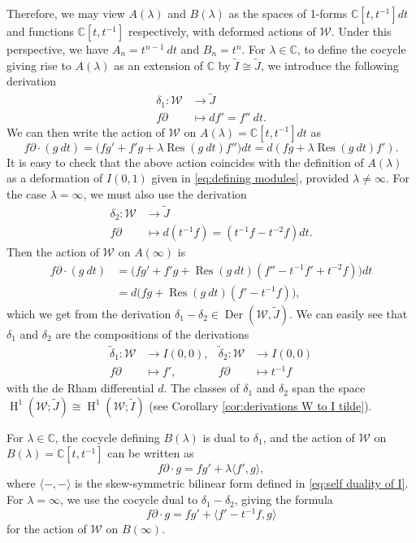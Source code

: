 \documentclass[11pt, svgnames]{amsart}
\DeclareMathOperator{\Res}{Res}
\newcommand{\CC}{\mathbb{C}}
\newcommand{\W}{\mathcal{W}}
\DeclareMathOperator{\Der}{Der}
\newcommand{\del}{\partial}
\DeclareMathOperator{\HH}{H}
\newcommand{\ang}[1]{\langle #1 \rangle}
\theoremstyle{definition}
\begin{document}
Therefore, we may view $A(\lambda)$ and $B(\lambda)$ as the spaces of 1-forms $\CC[t,t^{-1}]dt$ and functions $\CC[t,t^{-1}]$ respectively, with deformed actions of $\W$. Under this perspective, we have $A_n = t^{n - 1} \ dt$ and $B_n = t^n$. For $\lambda \in \CC$, to define the cocycle giving rise to $A(\lambda)$ as an extension of $\CC$ by $\widetilde{I} \cong \widetilde{J}$, we introduce the following derivation
\begin{align*}
    \delta_1 \colon \W &\to \widetilde{J} \\
    f\del &\mapsto df' = f'' \ dt.
\end{align*}
We can then write the action of $\W$ on $A(\lambda) = \CC[t,t^{-1}]dt$ as
$$f\del \cdot (g \ dt) = \Big(fg' + f'g + \lambda \Res(g \ dt) f''\Big)dt = d(fg + \lambda \Res(g \ dt) f').$$
It is easy to check that the above action coincides with the definition of $A(\lambda)$ as a deformation of $I(0,1)$ given in \eqref{eq:defining modules}, provided $\lambda \neq \infty$. For the case $\lambda = \infty$, we must also use the derivation
\begin{align*}
    \delta_2 \colon \W &\to \widetilde{J} \\
    f\del &\mapsto d(t^{-1}f) = (t^{-1}f - t^{-2}f)dt.
\end{align*}
Then the action of $\W$ on $A(\infty)$ is
\begin{align*}
    f\del \cdot (g \ dt) &= \Big(fg' + f'g + \Res(g \ dt) (f'' - t^{-1}f' + t^{-2}f)\Big)dt \\
    &= d\Big(fg + \Res(g \ dt) (f' - t^{-1}f)\Big),
\end{align*}
which we get from the derivation $\delta_1 - \delta_2 \in \Der(\W,\widetilde{J})$. We can easily see that $\delta_1$ and $\delta_2$ are the compositions of the derivations
\begin{align*}
    \widetilde{\delta}_1 \colon \W &\to I(0,0), & \widetilde{\delta}_2 \colon \W &\to I(0,0) \\
    f\del &\mapsto f', & f\del &\mapsto t^{-1}f
\end{align*}
with the de Rham differential $d$. The classes of $\delta_1$ and $\delta_2$ span the space $\HH^1(\W;\widetilde{J}) \cong \HH^1(\W;\widetilde{I})$ (see Corollary \ref{cor:derivations W to I tilde}).

For $\lambda \in \CC$, the cocycle defining $B(\lambda)$ is dual to $\delta_1$, and the action of $\W$ on $B(\lambda) = \CC[t,t^{-1}]$ can be written as
$$f\del \cdot g = fg' + \lambda \ang{f',g},$$
where $\ang{-,-}$ is the skew-symmetric bilinear form defined in \eqref{eq:self duality of I}. For $\lambda = \infty$, we use the cocycle dual to $\delta_1 - \delta_2$, giving the formula
$$f\del \cdot g = fg' + \ang{f' - t^{-1}f,g}$$
for the action of $\W$ on $B(\infty)$.
\end{document}
